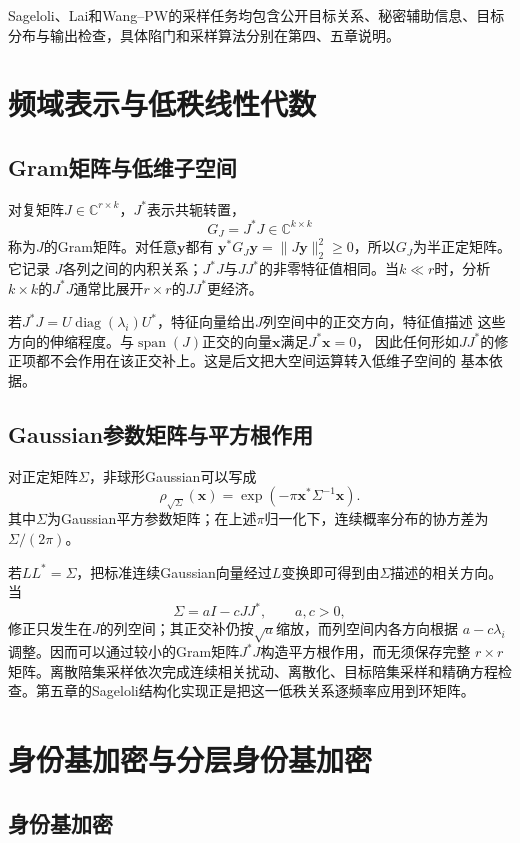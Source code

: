 Sageloli、Lai和Wang--PW的采样任务均包含公开目标关系、秘密辅助信息、目标分布与输出检查，具体陷门和采样算法分别在第四、五章说明。

\section{频域表示与低秩线性代数}

\subsection{Gram矩阵与低维子空间}

对复矩阵$J\in\mathbb C^{r\times k}$，$J^*$表示共轭转置，
\[
 G_J=J^*J\in\mathbb C^{k\times k}
\]
称为$J$的Gram矩阵。对任意$\mathbf y$都有
$\mathbf y^*G_J\mathbf y=\lVert J\mathbf y\rVert_2^2\geq0$，所以$G_J$为半正定矩阵。它记录
$J$各列之间的内积关系；$J^*J$与$JJ^*$的非零特征值相同。当$k\ll r$时，分析
$k\times k$的$J^*J$通常比展开$r\times r$的$JJ^*$更经济。

若$J^*J=U\operatorname{diag}(\lambda_i)U^*$，特征向量给出$J$列空间中的正交方向，特征值描述
这些方向的伸缩程度。与$\operatorname{span}(J)$正交的向量$\mathbf x$满足$J^*\mathbf x=0$，
因此任何形如$JJ^*$的修正项都不会作用在该正交补上。这是后文把大空间运算转入低维子空间的
基本依据。

\subsection{Gaussian参数矩阵与平方根作用}

对正定矩阵$\Sigma$，非球形Gaussian可以写成
\[
 \rho_{\sqrt\Sigma}(\mathbf x)
 =\exp(-\pi\mathbf x^*\Sigma^{-1}\mathbf x).
\]
其中$\Sigma$为Gaussian平方参数矩阵；在上述$\pi$归一化下，连续概率分布的协方差为$\Sigma/(2\pi)$。

若$L L^*=\Sigma$，把标准连续Gaussian向量经过$L$变换即可得到由$\Sigma$描述的相关方向。
当
\[
 \Sigma=aI-cJJ^*,\qquad a,c>0,
\]
修正只发生在$J$的列空间；其正交补仍按$\sqrt a$缩放，而列空间内各方向根据
$a-c\lambda_i$调整。因而可以通过较小的Gram矩阵$J^*J$构造平方根作用，而无须保存完整
$r\times r$矩阵。离散陪集采样依次完成连续相关扰动、离散化、目标陪集采样和精确方程检查。第五章的Sageloli结构化实现正是把这一低秩关系逐频率应用到环矩阵。

\section{身份基加密与分层身份基加密}

\subsection{身份基加密}

